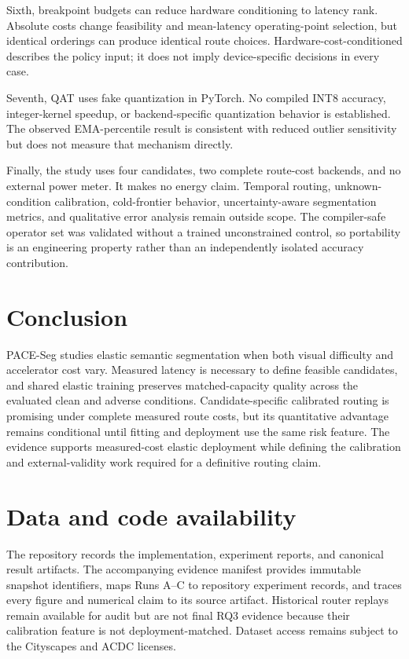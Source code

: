 \documentclass[a4paper,review,12pt]{elsarticle}
\newcommand{\method}{PACE-Seg}
\begin{document}
Sixth, breakpoint budgets can reduce hardware conditioning to latency rank. Absolute costs change feasibility and mean-latency operating-point selection, but identical orderings can produce identical route choices. Hardware-cost-conditioned describes the policy input; it does not imply device-specific decisions in every case.

Seventh, QAT uses fake quantization in PyTorch. No compiled INT8 accuracy, integer-kernel speedup, or backend-specific quantization behavior is established. The observed EMA-percentile result is consistent with reduced outlier sensitivity but does not measure that mechanism directly.

Finally, the study uses four candidates, two complete route-cost backends, and no external power meter. It makes no energy claim. Temporal routing, unknown-condition calibration, cold-frontier behavior, uncertainty-aware segmentation metrics, and qualitative error analysis remain outside scope. The compiler-safe operator set was validated without a trained unconstrained control, so portability is an engineering property rather than an independently isolated accuracy contribution.

\section{Conclusion}
\label{sec:conclusion}

\method{} studies elastic semantic segmentation when both visual difficulty and accelerator cost vary. Measured latency is necessary to define feasible candidates, and shared elastic training preserves matched-capacity quality across the evaluated clean and adverse conditions. Candidate-specific calibrated routing is promising under complete measured route costs, but its quantitative advantage remains conditional until fitting and deployment use the same risk feature. The evidence supports measured-cost elastic deployment while defining the calibration and external-validity work required for a definitive routing claim.

\section*{Data and code availability}

The repository records the implementation, experiment reports, and canonical result artifacts. The accompanying evidence manifest provides immutable snapshot identifiers, maps Runs A--C to repository experiment records, and traces every figure and numerical claim to its source artifact. Historical router replays remain available for audit but are not final RQ3 evidence because their calibration feature is not deployment-matched. Dataset access remains subject to the Cityscapes and ACDC licenses.
\end{document}
